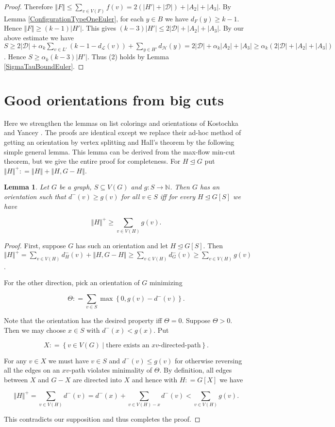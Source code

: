 \documentclass[12pt]{article}
\theoremstyle{plain}
\newtheorem{lem}[thm]{Lemma}
\theoremstyle{definition}
\theoremstyle{remark}
\newcommand{\fancy}[1]{\mathcal{#1}}
\newcommand{\IN}{\mathbb{N}}
\newcommand{\D}{\fancy{D}}
\renewcommand{\L}{\fancy{L}}
\newcommand{\HH}{\fancy{H}}
\newcommand{\set}[1]{\left\{ #1 \right\}}
\newcommand{\setb}[3]{\left\{ #1 \in #2 \mid #3 \right\}}
\newcommand{\card}[1]{\left|#1\right|}
\newcommand{\size}[1]{\left\Vert#1\right\Vert}
\newcommand{\func}[3]{#1\colon #2 \rightarrow #3}
\newcommand{\parens}[1]{\left( #1 \right)}
\newcommand{\DefinedAs}{\mathrel{\mathop:}=}
\def\D{\fancy{D}}
\begin{document}
\begin{proof}
Therefore $\size{F} \leq \sum_{v \in V(F)} f(v) = 2(\card{H'} + \card{\D}) + \card{A_2} + 
\card{A_3}$. By Lemma \ref{ConfigurationTypeOneEuler}, for each $y \in B$ we have $d_F(y) \geq k-1$.  Hence $\size{F} \geq (k-1)\card{H'}$.  This gives $(k-3)\card{H'} \leq 2\card{\D} + \card{A_2} + 
\card{A_3}$.  By our above estimate we have $S \geq 2\card{\D} + \alpha_k\sum_{v \in L'} \parens{k-1 - d_{\L}(v)}  + \sum_{y \in H'} d_{\HH}(y) = 2\card{\D} + \alpha_k\card{A_2} + \card{A_3} \geq \alpha_k(2\card{\D} + \card{A_2} + \card{A_3})$.  Hence $S \geq \alpha_k(k-3)\card{H'}$.  Thus (2) holds by Lemma \ref{SigmaTauBoundEuler}.
\end{proof}

\section{Good orientations from big cuts}\label{OrientationsSection}
Here we strengthen the lemmas on list colorings and orientations of Kostochka and Yancey \cite{kostochkayancey2012ore}.  The proofs are identical except we replace their ad-hoc method of getting an orientation by vertex splitting and Hall's theorem by the following simple general lemma.  This lemma can be derived from the max-flow min-cut theorem, but we give the entire proof for completeness.  For $H \unlhd G$ put $\size{H}^+ \DefinedAs \size{H} + \size{H, G-H}$.

\begin{lem}\label{InOrientations}
Let $G$ be a graph, $S \subseteq V(G)$ and $\func{g}{S}{\IN}$.  Then $G$ has an orientation such that $d^-(v) \geq g(v)$ for all $v \in S$ iff for every $H \unlhd G[S]$ we have

\[\size{H}^+ \geq \sum_{v \in V(H)} g(v).\]
\end{lem}
\begin{proof}
First, suppose $G$ has such an orientation and let $H \unlhd G[S]$.  Then $\size{H}^+ = \sum_{v \in V(H)} d_H^-(v) + \size{H, G-H} \geq \sum_{v \in V(H)} d_G^-(v) \geq \sum_{v \in V(H)} g(v)$.

For the other direction, pick an orientation of $G$ minimizing

\[\Theta \DefinedAs \sum_{v \in S} \max\set{0, g(v) - d^-(v)}.\]

\noindent Note that the orientation has the desired property iff $\Theta = 0$. Suppose $\Theta > 0$.  Then we may choose $x \in S$ with $d^-(x) < g(x)$. Put

\[X \DefinedAs \setb{v}{V(G)}{\text{there exists an $xv$-directed-path}}.\]

\noindent For any $v \in X$ we must have $v \in S$ and $d^-(v) \leq g(v)$ for otherwise reversing all the edges on an $xv$-path violates minimality of $\Theta$.  By definition, all edges between $X$ and $G-X$ are directed into $X$ and hence with $H \DefinedAs G[X]$ we have

\[\size{H}^+ = \sum_{v \in V(H)} d^-(v) = d^-(x) + \sum_{v \in V(H) - x} d^-(v) < \sum_{v \in V(H)} g(v).\]

\noindent This contradicts our supposition and thus completes the proof.
\end{proof}
\end{document}

